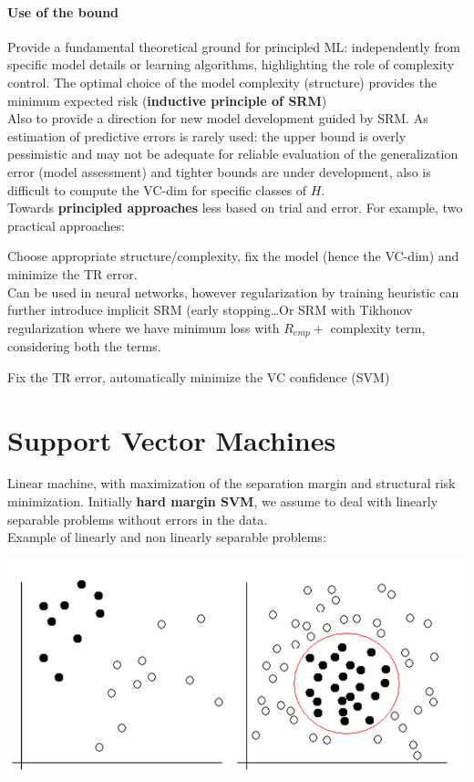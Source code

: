 \documentclass[10pt]{report}
\begin{document}
\paragraph{Use of the bound} Provide a fundamental theoretical ground for principled ML: independently from specific model details or learning algorithms, highlighting the role of complexity control. The optimal choice of the model complexity (structure) provides the minimum expected risk (\textbf{inductive principle of SRM})\\
Also to provide a direction for new model development guided by SRM. As estimation of predictive errors is rarely used: the upper bound is overly pessimistic and may not be adequate for reliable evaluation of the generalization error (model assessment) and tighter bounds are under development, also is difficult to compute the VC-dim for specific classes of $H$.\\
Towards \textbf{principled approaches} less based on trial and error. For example, two practical approaches:
\begin{list}{}{}
	\item Choose appropriate structure/complexity, fix the model (hence the VC-dim) and minimize the TR error.\\
	Can be used in neural networks, however regularization by training heuristic can further introduce implicit SRM (early stopping\ldots Or SRM with Tikhonov regularization where we have minimum loss with $R_{emp} +$ complexity term, considering both the terms.
	\item Fix the TR error, automatically minimize the VC confidence (SVM)
\end{list}
\section{Support Vector Machines}
Linear machine, with maximization of the separation margin and structural risk minimization. Initially \textbf{hard margin SVM}, we assume to deal with linearly separable problems without errors in the data.\\
Example of linearly and non linearly separable problems:
\begin{center}
	\includegraphics[scale=0.5]{17.png}
\end{center}
\end{document}
